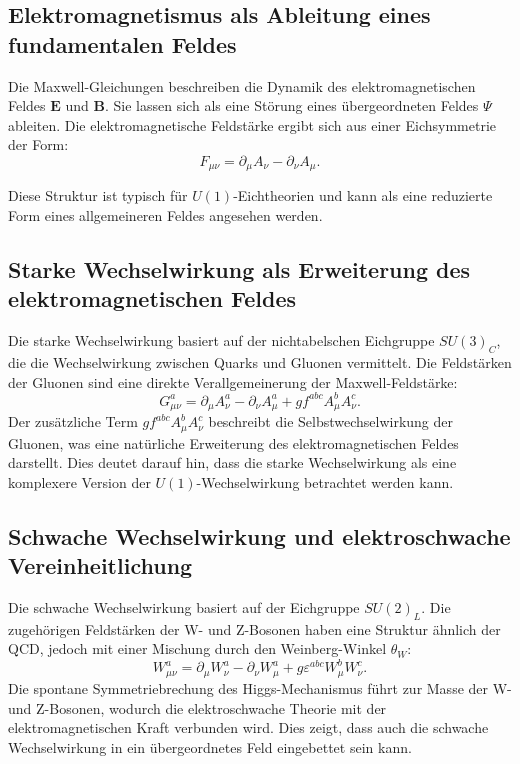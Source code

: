 \documentclass{article}
\begin{document}
	\subsection{Elektromagnetismus als Ableitung eines fundamentalen Feldes}
	Die Maxwell-Gleichungen beschreiben die Dynamik des elektromagnetischen Feldes $\mathbf{E}$ und $\mathbf{B}$. Sie lassen sich als eine Störung eines übergeordneten Feldes $\Psi$ ableiten. Die elektromagnetische Feldstärke ergibt sich aus einer Eichsymmetrie der Form:
	\begin{equation}
		F_{\mu\nu} = \partial_\mu A_\nu - \partial_\nu A_\mu.
	\end{equation}
	
	Diese Struktur ist typisch für $U(1)$-Eichtheorien und kann als eine reduzierte Form eines allgemeineren Feldes angesehen werden.
	
	\subsection{Starke Wechselwirkung als Erweiterung des elektromagnetischen Feldes}
	Die starke Wechselwirkung basiert auf der nichtabelschen Eichgruppe $SU(3)_C$, die die Wechselwirkung zwischen Quarks und Gluonen vermittelt. Die Feldstärken der Gluonen sind eine direkte Verallgemeinerung der Maxwell-Feldstärke:
	\begin{equation}
		G_{\mu\nu}^a = \partial_\mu A_\nu^a - \partial_\nu A_\mu^a + g f^{abc} A_\mu^b A_\nu^c.
	\end{equation}
	Der zusätzliche Term $g f^{abc} A_\mu^b A_\nu^c$ beschreibt die Selbstwechselwirkung der Gluonen, was eine natürliche Erweiterung des elektromagnetischen Feldes darstellt. Dies deutet darauf hin, dass die starke Wechselwirkung als eine komplexere Version der $U(1)$-Wechselwirkung betrachtet werden kann.
	
	\subsection{Schwache Wechselwirkung und elektroschwache Vereinheitlichung}
	Die schwache Wechselwirkung basiert auf der Eichgruppe $SU(2)_L$. Die zugehörigen Feldstärken der W- und Z-Bosonen haben eine Struktur ähnlich der QCD, jedoch mit einer Mischung durch den Weinberg-Winkel $\theta_W$:
	\begin{equation}
		W_{\mu\nu}^a = \partial_\mu W_\nu^a - \partial_\nu W_\mu^a + g \varepsilon^{abc} W_\mu^b W_\nu^c.
	\end{equation}
	Die spontane Symmetriebrechung des Higgs-Mechanismus führt zur Masse der W- und Z-Bosonen, wodurch die elektroschwache Theorie mit der elektromagnetischen Kraft verbunden wird. Dies zeigt, dass auch die schwache Wechselwirkung in ein übergeordnetes Feld eingebettet sein kann.
	
\end{document}
